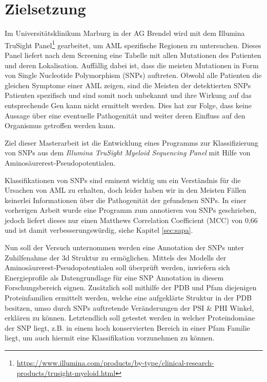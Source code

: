 \section{Zielsetzung}

Im Universitätsklinikum Marburg in der AG Brendel wird mit dem Illumina TruSight Panel\footnote{\url{https://www.illumina.com/products/by-type/clinical-research-products/trusight-myeloid.html}} gearbeitet, um AML spezifische Regionen zu untersuchen. Dieses Panel liefert nach dem Screening eine Tabelle mit allen Mutationen des Patienten und deren Lokalisation. Auffällig dabei ist, dass die meisten Mutationen in Form von Single Nucleotide Polymorphism (SNPs) auftreten. Obwohl alle Patienten die gleichen Symptome einer AML zeigen, sind die Meisten der detektierten SNPs Patienten spezifisch und sind somit noch unbekannt und ihre Wirkung auf das entsprechende Gen kann nicht ermittelt werden. Dies hat zur Folge, dass keine Aussage über eine eventuelle Pathogenität und weiter deren Einfluss auf den Organismus getroffen werden kann.

Ziel dieser Masterarbeit ist die Entwicklung eines Programms zur Klassifizierung von SNPs aus dem \emph{Illumina TruSight Myeloid Sequencing Panel} mit Hilfe von Aminosäurerest-Pseudopotentialen.

Klassifikationen von SNPs sind eminent wichtig um ein Verständnis für die Ursachen von AML zu erhalten, doch leider haben wir in den Meisten Fällen keinerlei Informationen über die Pathogenität der gefundenen SNPs. In einer vorherigen Arbeit wurde eine Programm zum annotieren von SNPs geschrieben, jedoch liefert dieses nur einen Matthews Correlation Coefficient (MCC) von 0,66 und ist damit verbesserungswürdig, siehe Kapitel \ref{sec:sapa}. 

Nun soll der Versuch unternommen werden eine Annotation der SNPs unter Zuhilfenahme der 3d Struktur zu ermöglichen. Mittels des Modells der Aminosäurerest-Pseudopotentialen soll überprüft werden, inwiefern sich Energieprofile als Datengrundlage für eine SNP Annotation in diesem Forschungsbereich eignen. Zusätzlich soll mithilfe der PDB und Pfam diejenigen Proteinfamilien ermittelt werden, welche eine aufgeklärte Struktur in der PDB besitzen, umso durch SNPs auftretende Veränderungen der PSI \& PHI Winkel, erklären zu können. Letztendlich soll getestet werden in welcher Proteindomäne der SNP liegt, z.B. in einem hoch konservierten Bereich in einer Pfam Familie liegt, um auch hiermit eine Klassifikation vorzunehmen zu können.



